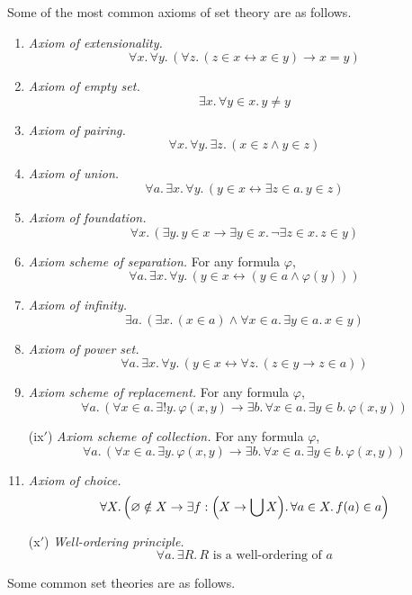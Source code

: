 Some of the most common axioms of set theory are as follows.
\begin{enumerate}
    \item \emph{Axiom of extensionality.}
    \[ \forall x.\, \forall y.\, (\forall z.\, (z \in x \leftrightarrow x \in y) \to x = y) \]
    \item \emph{Axiom of empty set.}
    \[ \exists x.\, \forall y \in x.\, y \neq y \]
    \item \emph{Axiom of pairing.}
    \[ \forall x.\, \forall y.\, \exists z.\, (x \in z \wedge y \in z) \]
    \item \emph{Axiom of union.}
    \[ \forall a.\, \exists x.\, \forall y.\, (y \in x \leftrightarrow \exists z \in a.\, y \in z) \]
    \item \emph{Axiom of foundation.}
    \[ \forall x.\, (\exists y.\, y \in x \to \exists y \in x.\, \neg\exists z \in x.\, z \in y) \]
    \item \emph{Axiom scheme of separation.} For any formula \( \varphi \),
    \[ \forall a.\, \exists x.\, \forall y.\, (y \in x \leftrightarrow (y \in a \wedge \varphi(y))) \]
    \item \emph{Axiom of infinity.}
    \[ \exists a.\, (\exists x.\, (x \in a) \wedge \forall x \in a.\, \exists y \in a.\, x \in y) \]
    \item \emph{Axiom of power set.}
    \[ \forall a.\, \exists x.\, \forall y.\, (y \in x \leftrightarrow \forall z.\, (z \in y \to z \in a)) \]
    \item \emph{Axiom scheme of replacement.} For any formula \( \varphi \),
    \[ \forall a.\, (\forall x \in a.\, \exists! y.\, \varphi(x, y) \to \exists b.\, \forall x \in a.\, \exists y \in b.\, \varphi(x, y)) \]
    \item[(ix\('\))] \emph{Axiom scheme of collection.} For any formula \( \varphi \),
    \[ \forall a.\, (\forall x \in a.\, \exists y.\, \varphi(x, y) \to \exists b.\, \forall x \in a.\, \exists y \in b.\, \varphi(x, y)) \]
    \item \emph{Axiom of choice.}
    \[ \forall X.\, \qty(\varnothing \notin X \to \exists f : \qty(X \to \bigcup X).\, \forall a \in X.\, f(a) \in a) \]
    \item[(x\('\))] \emph{Well-ordering principle.}
    \[ \forall a.\, \exists R.\, R \text{ is a well-ordering of } a \]
\end{enumerate}
Some common set theories are as follows.
